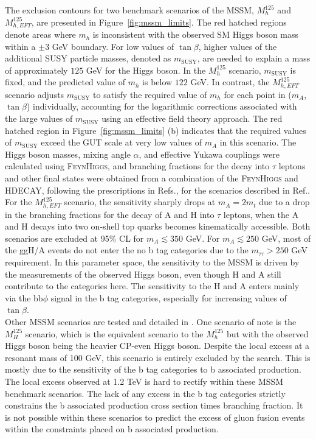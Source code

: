 The exclusion contours for two benchmark scenarios of the MSSM, $M_{h}^{125}$ and $M_{h,EFT}^{125}$, are presented in Figure~\ref{fig:mssm_limits}. 
The red hatched regions denote areas where $m_{h}$ is inconsistent with the observed SM Higgs boson mass within a ${\pm}3$ GeV boundary. 
For low values of $\tan\beta$, higher values of the additional SUSY particle masses, denoted as $m_{\text{SUSY}}$, are needed to explain a mass of approximately $125$ GeV for the Higgs boson. 
In the $M_{h}^{125}$ scenario, $m_{\text{SUSY}}$ is fixed, and the predicted value of $m_{h}$ is below $122$ GeV. 
In contrast, the $M_{h,EFT}^{125}$ scenario adjusts $m_{\text{SUSY}}$ to satisfy the required value of $m_{h}$ for each point in ($m_{A}$, $\tan\beta$) individually, accounting for the logarithmic corrections associated with the large values of $m_{\text{SUSY}}$ using an effective field theory approach. 
The red hatched region in Figure~\ref{fig:mssm_limits} (b) indicates that the required values of $m_{\text{SUSY}}$ exceed the GUT scale at very low values of $m_{A}$ in this scenario. 
The Higgs boson masses, mixing angle $\alpha$, and effective Yukawa couplings were calculated using \textsc{FeynHiggs}, and branching fractions for the decay into $\tau$ leptons and other final states were obtained from a combination of the \textsc{FeynHiggs} and \textsc{HDECAY}, following the prescriptions in Refs.\cite{LHCHiggsCrossSectionWorkingGroup:2013rie,deFlorian:2016spz,Denner:2011mq}, for the scenarios described in Ref.\cite{Bagnaschi:2791954}. \\

For the $M_{h,EFT}^{125}$ scenario, the sensitivity sharply drops at $m_{A}=2m_{t}$ due to a drop in the branching fractions for the decay of A and H into $\tau$ leptons, when the A and H decays into two on-shell top quarks becomes kinematically accessible. 
Both scenarios are excluded at 95\% CL for $m_{A}\lesssim350$ GeV. 
For $m_{A}\lesssim250$ GeV, most of the ggH/A events do not enter the no b tag categories due to the $m_{\tau\tau}>250$ GeV requirement. 
In this parameter space, the sensitivity to the MSSM is driven by the measurements of the observed Higgs boson, even though H and A still contribute to the categories here. 
The sensitivity to the H and A enters mainly via the bb$\phi$ signal in the b tag categories, especially for increasing values of $\tan\beta$. \\

Other MSSM scenarios are tested and detailed in \cite{CMS:2022rbd}.
One scenario of note is the $M_{H}^{125}$ scenario, which is the equivalent scenario to the $M_{h}^{125}$ but with the observed Higgs boson being the heavier CP-even Higgs boson.
Despite the local excess at a resonant mass of 100 GeV, this scenario is entirely excluded by the search. 
This is mostly due to the sensitivity of the b tag categories to b associated production.
The local excess observed at 1.2 TeV is hard to rectify within these MSSM benchmark scenarios.
The lack of any excess in the b tag categories strictly constrains the b associated production cross section times branching fraction.
It is not possible within these scenarios to predict the excess of gluon fusion events within the constraints placed on b associated production. \\

